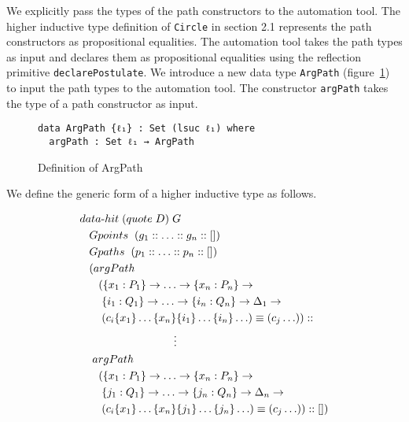 \documentclass[sigplan,10pt]{acmart}
\begin{document}
We explicitly pass the types of the path constructors to the automation tool. The higher inductive type definition of {\tt Circle} in section 2.1 represents the path constructors as propositional equalities. The automation tool takes the path types as input and declares them as propositional equalities using the reflection primitive {\tt declarePostulate}. We introduce a new data type {\tt ArgPath} (figure~\ref{fig:argPath}) to input the path types to the automation tool. The constructor {\tt argPath} takes the type of a path constructor as input.

\begin{figure}
\begin{center}
\begingroup
\begin{BVerbatim}
data ArgPath {ℓ₁} : Set (lsuc ℓ₁) where
  argPath : Set ℓ₁ → ArgPath
\end{BVerbatim}
\endgroup
\end{center}
\caption{Definition of ArgPath}
\label{fig:argPath}
\end{figure}

We define the generic form of a higher inductive type as follows.
\begin{center}
\begingroup
\fontsize{7.9pt}{0pt}\selectfont
\begin{align}
& data{\text -}hit \hspace {0.1cm} (quote \hspace {0.1cm} D) \hspace {0.1cm} G \nonumber \\
  & \hspace {0.3cm} Gpoints \hspace {0.2cm} (g_1 ::  \ldots :: g_n :: []) \nonumber \\
  & \hspace {0.3cm} Gpaths  \hspace {0.2cm} (p_1 :: \ldots :: p_n :: []) \nonumber \\
  & \hspace {0.3cm} (argPath \nonumber \\
  & \hspace {0.6cm} (\{x_1:P_1\} \rightarrow \ldots \rightarrow \{x_n:P_n\} \rightarrow \nonumber \\
  & \hspace {0.7cm} \{i_1:Q_1\} \rightarrow \ldots \rightarrow \{i_n:Q_n\} \rightarrow \Delta_1 \rightarrow \nonumber \\
  & \hspace {0.7cm} (c_i \{x_1\} \ldots \{x_n\} \{i_1\} \ldots \{i_n\} \ldots) \equiv (c_j \ldots)) :: \nonumber \\
  & \hspace {3cm} \vdots \nonumber \\
  & \hspace {0.4cm} argPath \nonumber \\
  & \hspace {0.6cm} (\{x_1:P_1\} \rightarrow \ldots \rightarrow \{x_n:P_n\} \rightarrow \nonumber \\
  & \hspace {0.7cm} \{j_1:Q_1\} \rightarrow \ldots \rightarrow \{j_n:Q_n\} \rightarrow \Delta_n \rightarrow \nonumber \\
  & \hspace {0.7cm} (c_i \{x_1\} \ldots \{x_n\} \{j_1\} \ldots \{j_n\} \ldots) \equiv (c_j \ldots)) :: [])\nonumber \\ \nonumber
\end{align}
\endgroup
\end{center}
\normalsize
\end{document}
